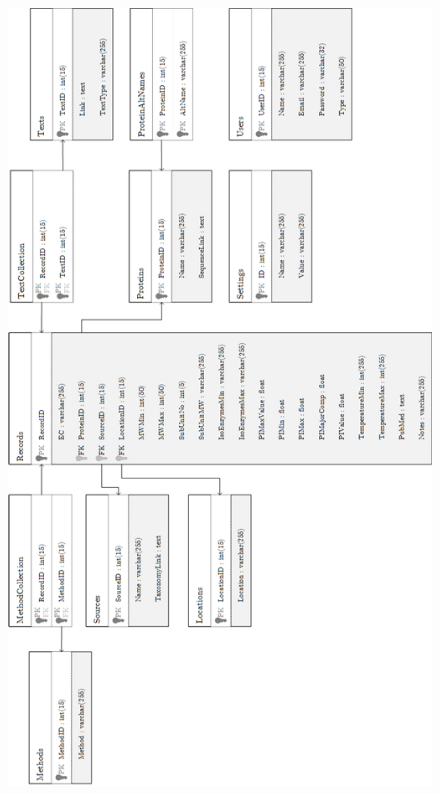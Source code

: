 \documentclass[12pt,a4paper]{article}
\begin{document}
\begin{figure}[H]
\centering
\includegraphics{assets/uml-previous-fyp-database.png}
\label{fig:graph-interval-dropped}
\end{figure}


\appendix
\setcounter{secnumdepth}{1}
\begin{subappendices}

\end{subappendices}

\newpage
\begin{thebibliography}{9}

\end{thebibliography}
\end{document}
